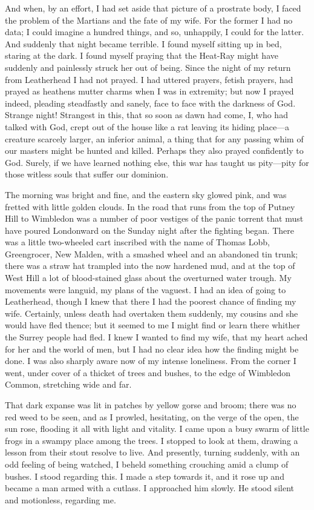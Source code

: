 And when, by an effort, I had set aside that picture of a prostrate body, I faced the problem of the Martians and the fate of my wife. For the former I had no data; I could imagine a hundred things, and so, unhappily, I could for the latter. And suddenly that night became terrible. I found myself sitting up in bed, staring at the dark. I found myself praying that the Heat-Ray might have suddenly and painlessly struck her out of being. Since the night of my return from Leatherhead I had not prayed. I had uttered prayers, fetish prayers, had prayed as heathens mutter charms when I was in extremity; but now I prayed indeed, pleading steadfastly and sanely, face to face with the darkness of God. Strange night! Strangest in this, that so soon as dawn had come, I, who had talked with God, crept out of the house like a rat leaving its hiding place—a creature scarcely larger, an inferior animal, a thing that for any passing whim of our masters might be hunted and killed. Perhaps they also prayed confidently to God. Surely, if we have learned nothing else, this war has taught us pity—pity for those witless souls that suffer our dominion.

The morning was bright and fine, and the eastern sky glowed pink, and was fretted with little golden clouds. In the road that runs from the top of Putney Hill to Wimbledon was a number of poor vestiges of the panic torrent that must have poured Londonward on the Sunday night after the fighting began. There was a little two-wheeled cart inscribed with the name of Thomas Lobb, Greengrocer, New Malden, with a smashed wheel and an abandoned tin trunk; there was a straw hat trampled into the now hardened mud, and at the top of West Hill a lot of blood-stained glass about the overturned water trough. My movements were languid, my plans of the vaguest. I had an idea of going to Leatherhead, though I knew that there I had the poorest chance of finding my wife. Certainly, unless death had overtaken them suddenly, my cousins and she would have fled thence; but it seemed to me I might find or learn there whither the Surrey people had fled. I knew I wanted to find my wife, that my heart ached for her and the world of men, but I had no clear idea how the finding might be done. I was also sharply aware now of my intense loneliness. From the corner I went, under cover of a thicket of trees and bushes, to the edge of Wimbledon Common, stretching wide and far.

That dark expanse was lit in patches by yellow gorse and broom; there was no red weed to be seen, and as I prowled, hesitating, on the verge of the open, the sun rose, flooding it all with light and vitality. I came upon a busy swarm of little frogs in a swampy place among the trees. I stopped to look at them, drawing a lesson from their stout resolve to live. And presently, turning suddenly, with an odd feeling of being watched, I beheld something crouching amid a clump of bushes. I stood regarding this. I made a step towards it, and it rose up and became a man armed with a cutlass. I approached him slowly. He stood silent and motionless, regarding me.

